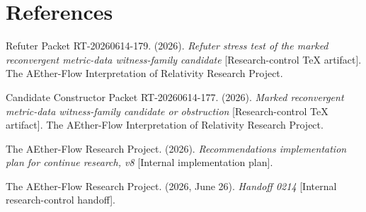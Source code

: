 \documentclass[11pt]{article}
\begin{document}
\section{References}

Refuter Packet RT-20260614-179. (2026). \emph{Refuter stress test of the
marked reconvergent metric-data witness-family candidate} [Research-control
TeX artifact]. The AEther-Flow Interpretation of Relativity Research Project.

Candidate Constructor Packet RT-20260614-177. (2026). \emph{Marked
reconvergent metric-data witness-family candidate or obstruction}
[Research-control TeX artifact]. The AEther-Flow Interpretation of Relativity
Research Project.

The AEther-Flow Research Project. (2026). \emph{Recommendations implementation
plan for continue research, v8} [Internal implementation plan].

The AEther-Flow Research Project. (2026, June 26). \emph{Handoff 0214}
[Internal research-control handoff].
\end{document}
